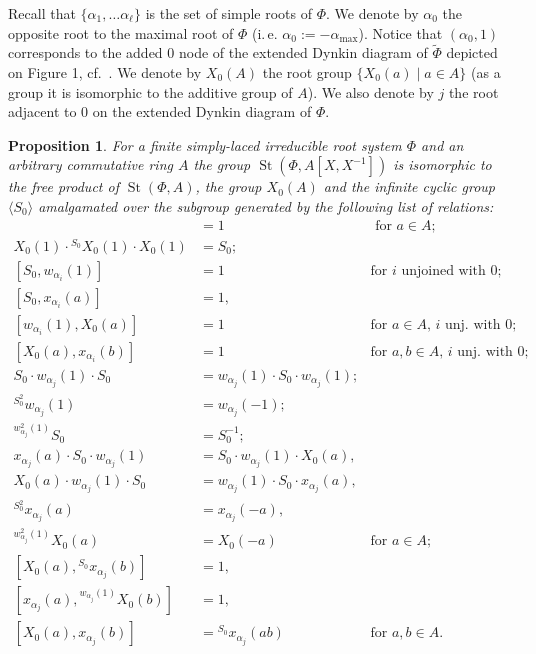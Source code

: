 \documentclass[oneside, 10pt]{amsart}
\DeclareMathOperator{\St}{St}
\newcommand{\inv}{^{-1}}
\numberwithin{equation}{section}
\numberwithin{thm}{section}
\numberwithin{lemma}{section}
\newtheorem{prop}[lemma]{Proposition}
\theoremstyle{definition}
\theoremstyle{remark}
\begin{document}
Recall that $\{ \alpha_1, \ldots \alpha_\ell \}$ is the set of simple roots of $\Phi$.
We denote by $\alpha_0$ the opposite root to the maximal root of $\Phi$ (i.\,e. $\alpha_0 := -\alpha_\mathrm{max}$).
Notice that $(\alpha_0, 1)$ corresponds to the added $0$ node of the extended Dynkin diagram of $\widetilde{\Phi}$ depicted on Figure 1, cf.~\cite[\S~4]{A16}.
We denote by $X_0(A)$ the root group $\{ X_0(a) \mid a \in A\}$ (as a group it is isomorphic to the additive group of $A$).
We also denote by $j$ the root adjacent to $0$ on the extended Dynkin diagram of $\Phi$.
\begin{prop} \label{prop:Allcock-affine} For a finite simply-laced irreducible root system $\Phi$ and an arbitrary commutative ring $A$
the group $\St(\Phi, A[X, X\inv])$ is isomorphic to the free product of $\St(\Phi, A)$, the group $X_0(A)$ and the infinite cyclic group $\langle S_0 \rangle$
amalgamated over the subgroup generated by the following list of relations:
{\allowdisplaybreaks\begin{align}
[S_0^2, X_0(a)] & = 1 & \text{ for $a \in A$; } \label{eq:Allcock-2} \\
X_0(1) \cdot {}^{S_0} X_0(1) \cdot X_0(1) & = S_0; \label{eq:Allcock-3} \\
[S_0, w_{\alpha_i}(1)] & = 1 &  \text{for $i$ unjoined with $0$;} \label{eq:Allcock-4} \\
[S_0, x_{\alpha_i}(a)] & = 1, &  \label{eq:Allcock-5-1}\\
[w_{\alpha_i}(1), X_0(a)] & = 1 & \text{for $a \in A$, $i$ unj. with $0$;} \label{eq:Allcock-5-2} \\
[X_0(a), x_{\alpha_i}(b)] & = 1 & \text{for $a, b \in A$, $i$ unj. with $0$;} \label{eq:Allcock-6} \\
S_0 \cdot w_{\alpha_j}(1) \cdot S_0 & = w_{\alpha_j}(1) \cdot S_0 \cdot w_{\alpha_j}(1); \label{eq:Allcock-7} \\
{}^{S_0^2} w_{\alpha_j}(1) & = w_{\alpha_j}(-1); \label{eq:Allcock-8-1} \\
{}^{w_{\alpha_j}^2(1)} S_0 & = S_0^{-1}; \label{eq:Allcock-8-2} \\
x_{\alpha_j}(a) \cdot S_0 \cdot w_{\alpha_j}(1) & = S_0 \cdot w_{\alpha_j}(1) \cdot X_0(a), & \label{eq:Allcock-9-1} \\
X_0(a) \cdot w_{\alpha_j}(1) \cdot S_0 & = w_{\alpha_j}(1) \cdot S_0 \cdot x_{\alpha_j}(a), & \label{eq:Allcock-9-2} \\
{}^{S_0^2} x_{\alpha_j}(a) & = x_{\alpha_j}(-a), & \label{eq:Allcock-10-1} \\
{}^{w_{\alpha_j}^2(1)} X_0(a) & = X_0(-a) & \text{for $a \in A;$} \label{eq:Allcock-10-2} \\
[X_0(a), {}^{S_0} x_{\alpha_j}(b)] &= 1, & \label{eq:Allcock-11-1} \\
[x_{\alpha_j}(a), {}^{w_{\alpha_j}(1)}X_0(b)] &= 1, & \label{eq:Allcock-11-2} \\
[X_0(a), x_{\alpha_j}(b)] &= {}^{S_0} x_{\alpha_j}(ab) & \text{for $a, b \in A.$} \label{eq:Allcock-12}
\end{align}}
\end{prop}
\end{document}
